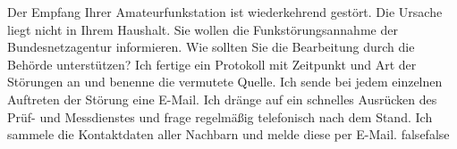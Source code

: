     {Der Empfang Ihrer Amateurfunkstation ist wiederkehrend gestört. Die Ursache liegt nicht in Ihrem Haushalt. Sie wollen die Funkstörungsannahme der Bundesnetzagentur informieren. Wie sollten Sie die Bearbeitung durch die Behörde unterstützen?}
    {Ich fertige ein Protokoll mit Zeitpunkt und Art der Störungen an und benenne die vermutete Quelle.}
    {Ich sende bei jedem einzelnen Auftreten der Störung eine E-Mail.}
    {Ich dränge auf ein schnelles Ausrücken des Prüf- und Messdienstes und frage regelmäßig telefonisch nach dem Stand.}
    {Ich sammele die Kontaktdaten aller Nachbarn und melde diese per E-Mail.}
    {false}{false}